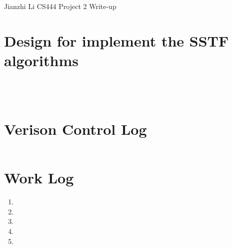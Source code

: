 \documentclass[letterpaper,11pt,titlepage]{article}
\begin{document}
Jianzhi Li\newline
CS444 Project 2 Write-up

\section{Design for implement the SSTF algorithms}


\subsection{}

\begin{lstlisting}

\end{lstlisting}


\subsection{}

\begin{lstlisting}

\end{lstlisting}




\section{Verison Control Log}

\begin{table}[!hbp]
\begin{tabular}{|c|}

\hline

\hline

\hline

\hline

\hline

\hline

\hline

\hline

\hline
 
 
\end{tabular}
\end{table}

\section{Work Log}
\begin{enumerate}

\item 

\item 
\item 

\item

\item 

\end{enumerate}
\end{document}
